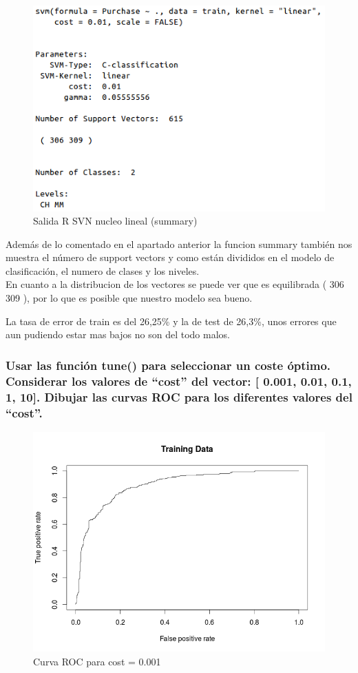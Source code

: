 \begin{figure}[H]
\centering
\includegraphics[scale=0.50]{ej1-2.png}
\caption{Salida R SVN nucleo lineal (summary)}
\label{}
\end{figure}

Además de lo comentado en el apartado anterior la funcion summary también nos muestra el número de support vectors y como están divididos en el modelo de clasificación, el numero de clases y los niveles.\\

En cuanto a la distribucion de los vectores se puede ver que es equilibrada ( 306 309 ), por lo que es posible que nuestro modelo sea bueno.

La tasa de error de train es del 26,25\% y la de test de 26,3\%, unos errores que aun pudiendo estar mas bajos no son del todo malos.

\subsubsection{Usar las función tune() para seleccionar un coste óptimo. Considerar los valores de “cost” del vector: [ 0.001, 0.01, 0.1, 1, 10]. Dibujar las curvas ROC para los diferentes valores del “cost”.}


\begin{figure}[H]
\centering
\includegraphics[scale=0.50]{ej1-31.png}
\caption{Curva ROC para cost = 0.001}
\label{}
\end{figure}

